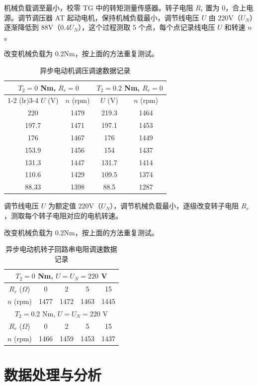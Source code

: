 \documentclass[12pt,a4paper]{article}
\begin{document}
机械负载调至最小，校零 TG 中的转矩测量传感器。转子电阻 $R_r$ 置为 0，合上电源。调节调压器 AT 起动电机，保持机械负载最小，调节线电压 $U$ 由 220V（$U_N$）逐渐降低到 88V（$0.4U_N$），这个过程测取 5 个点，每个点记录线电压 $U$ 和转速 $n$。

改变机械负载为 0.2Nm，按上面的方法重复测试。

\begin{table}[h]
\centering
\caption{异步电动机调压调速数据记录}
\begin{tabular}{cccc}
\toprule
\multicolumn{2}{c}{$T_2 = 0$ Nm, $R_r = 0$} & \multicolumn{2}{c}{$T_2 = 0.2$ Nm, $R_r = 0$} \\
\cmidrule(lr){1-2} \cmidrule(lr){3-4}
$U$ (V) & $n$ (rpm) & $U$ (V) & $n$ (rpm) \\
\midrule
220 & 1479 & 219.3 & 1464 \\
197.7 & 1471 & 197.1 & 1453 \\
176 & 1467 & 176 & 1449 \\
153.9 & 1456 & 154 & 1437 \\
131.3 & 1447 & 131.7 & 1414 \\
110.6 & 1429 & 109.5 & 1374 \\
88.33 & 1398 & 88.5 & 1287 \\
\bottomrule
\end{tabular}
\end{table}

调节线电压 $U$ 为额定值 220V（$U_N$），调节机械负载最小，逐级改变转子电阻 $R_r$，测取每个转子电阻对应的电机转速。

改变机械负载为 0.2Nm，按上面的方法重复测试。

\begin{table}[h]
\centering
\caption{异步电动机转子回路串电阻调速数据记录}
\begin{tabular}{ccccc}
\toprule
\multicolumn{5}{c}{$T_2 = 0$ Nm, $U = U_N = 220$ V} \\
\midrule
$R_r$ ($\Omega$) & 0 & 2 & 5 & 15 \\
$n$ (rpm) & 1477&	1472	&1463&	1445	\\
\midrule
\multicolumn{5}{c}{$T_2 = 0.2$ Nm, $U = U_N = 220$ V} \\
\midrule
$R_r$ ($\Omega$) & 0 & 2 & 5 & 15 \\
$n$ (rpm) &1466&	1459&	1453&	1437\\
\bottomrule
\end{tabular}
\end{table}
\section{数据处理与分析}
\end{document}
